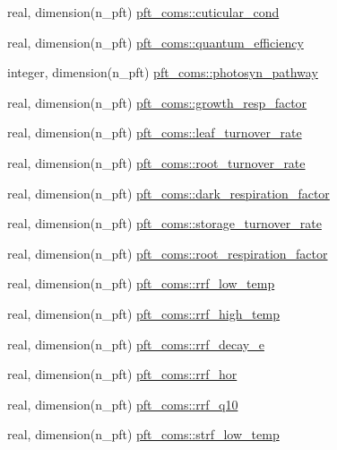 \begin{DoxyCompactItemize}
real, dimension(n\+\_\+pft) \hyperlink{namespacepft__coms_a123da989ae706b508ed48db4a138ff8e}{pft\+\_\+coms\+::cuticular\+\_\+cond}
\item 
real, dimension(n\+\_\+pft) \hyperlink{namespacepft__coms_ad1cdaf379a14e627f176105d6d744edb}{pft\+\_\+coms\+::quantum\+\_\+efficiency}
\item 
integer, dimension(n\+\_\+pft) \hyperlink{namespacepft__coms_a697c05e70b11e609bd5316b8eed821ed}{pft\+\_\+coms\+::photosyn\+\_\+pathway}
\item 
real, dimension(n\+\_\+pft) \hyperlink{namespacepft__coms_ae299a7616ce4a71415041f39e6e55d6c}{pft\+\_\+coms\+::growth\+\_\+resp\+\_\+factor}
\item 
real, dimension(n\+\_\+pft) \hyperlink{namespacepft__coms_a3c2cfe5a5095b3617d6ef0eda3088d07}{pft\+\_\+coms\+::leaf\+\_\+turnover\+\_\+rate}
\item 
real, dimension(n\+\_\+pft) \hyperlink{namespacepft__coms_a99860b135721c9298c4a28c8eeaab425}{pft\+\_\+coms\+::root\+\_\+turnover\+\_\+rate}
\item 
real, dimension(n\+\_\+pft) \hyperlink{namespacepft__coms_acd493e3e4371571956c651698a6462b9}{pft\+\_\+coms\+::dark\+\_\+respiration\+\_\+factor}
\item 
real, dimension(n\+\_\+pft) \hyperlink{namespacepft__coms_ac6e0048b175e1bdd410e60c25eddd828}{pft\+\_\+coms\+::storage\+\_\+turnover\+\_\+rate}
\item 
real, dimension(n\+\_\+pft) \hyperlink{namespacepft__coms_a3bc4fe17b80e40b1224d3e46d9699a66}{pft\+\_\+coms\+::root\+\_\+respiration\+\_\+factor}
\item 
real, dimension(n\+\_\+pft) \hyperlink{namespacepft__coms_a87bba89213b158e2aed4dac23565b3d6}{pft\+\_\+coms\+::rrf\+\_\+low\+\_\+temp}
\item 
real, dimension(n\+\_\+pft) \hyperlink{namespacepft__coms_ae05300b2ffecef7671154f099c69e0bb}{pft\+\_\+coms\+::rrf\+\_\+high\+\_\+temp}
\item 
real, dimension(n\+\_\+pft) \hyperlink{namespacepft__coms_a2087ec09afb37705591b08017b2bcb27}{pft\+\_\+coms\+::rrf\+\_\+decay\+\_\+e}
\item 
real, dimension(n\+\_\+pft) \hyperlink{namespacepft__coms_a5fc24fd1652202216904fe39f1a2f318}{pft\+\_\+coms\+::rrf\+\_\+hor}
\item 
real, dimension(n\+\_\+pft) \hyperlink{namespacepft__coms_aadcb3d9b31b09de0ee92c5c0d549ce28}{pft\+\_\+coms\+::rrf\+\_\+q10}
\item 
real, dimension(n\+\_\+pft) \hyperlink{namespacepft__coms_a1e68af5e117a86b34f515771b0aa4b37}{pft\+\_\+coms\+::strf\+\_\+low\+\_\+temp}

\end{DoxyCompactItemize}
